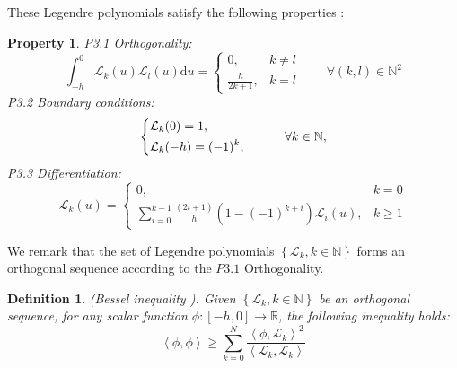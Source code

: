 \documentclass[a4paper]{cas-sc}
\newtheorem{defi}[theorem]{Definition}
\newtheorem{property}[theorem]{Property}
\begin{document}
These Legendre polynomials satisfy the following properties \citep{bos2017orthogonality}:
\begin{property}

  \textit{P3.1} Orthogonality:
  \begin{equation}
    \int_{ - h}^0 {{\mathcal{L}_k}} (u){\mathcal{L}_l}(u){\text{d}}u = \left\{ {\begin{array}{*{20}{l}}
          {0,}                  & {k \ne l} \\
          {\frac{h}{{2k + 1}},} & {k = l}
        \end{array}} \right.\quad \quad \forall (k,l) \in {\mathbb{N}^2}
    \label{p3.1}
  \end{equation}
  \textit{P3.2} Boundary conditions:
  \begin{equation}
    \left\{ \begin{gathered}
      {\mathcal{L}_k}(0) = 1, \hfill \\
      {\mathcal{L}_k}( - h) = {( - 1)^k}, \hfill \\
    \end{gathered}  \right.\quad \quad \quad \forall k \in \mathbb{N},
    \label{p3.2}
  \end{equation}
  \textit{P3.3} Differentiation:
  \begin{equation}
    \dot{\mathcal{L}}_{k}(u)= \begin{cases}0, & k=0 \\ \sum_{i=0}^{k-1} \frac{(2 i+1)}{h}\left(1-(-1)^{k+i}\right) \mathcal{L}_{i}(u), & k \geq 1\end{cases}
    \label{p3.3}
  \end{equation}
\end{property}

We remark that the set of Legendre polynomials $\left\{ {{\mathcal{L}_k},k \in \mathbb{N}} \right\}$ forms an orthogonal sequence according to the $P3.1$ Orthogonality.

\begin{defi}
  (Bessel inequality \citep{dragomir2001note}). Given $\left\{ {{\mathcal{L}_k},k \in \mathbb{N}} \right\} $ be an orthogonal sequence, for any scalar function $\phi :\left[ { - h,0} \right] \to \mathbb{R} $, the following inequality holds:
  \begin{equation}
    \left\langle {\phi ,\phi } \right\rangle  \geqslant \sum\limits_{k = 0}^N {\frac{{{{\left\langle {\phi ,{\mathcal{L}_k}} \right\rangle }^2}}}{{\left\langle {{\mathcal{L}_k},{\mathcal{L}_k}} \right\rangle }}}
  \end{equation}
\end{defi}
\end{document}

